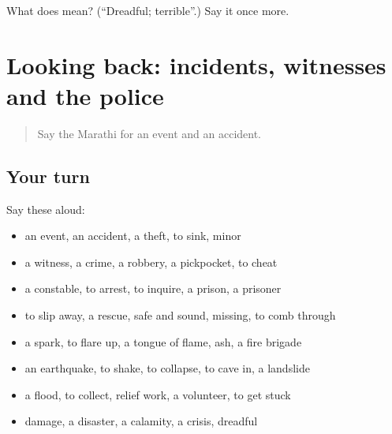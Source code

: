 \begin{tcolorbox}[breakable,colback=teal!4,colframe=teal!35!black,title={Before you move on}]
What does  mean? (\textquotedblleft{}Dreadful; terrible\textquotedblright{}.) Say it once more.
\end{tcolorbox}
\section[(dialogue)]{Looking back: incidents, witnesses and the police}

\label{lesson:MR-R295-review-288-295}



\begin{quote}
Say the Marathi for an event and an accident.
\end{quote}

\subsection*{Your turn}
Say these aloud:

\begin{itemize}
\raggedright
  \item an event, an accident, a theft, to sink, minor
  \item a witness, a crime, a robbery, a pickpocket, to cheat
  \item a constable, to arrest, to inquire, a prison, a prisoner
  \item to slip away, a rescue, safe and sound, missing, to comb through
  \item a spark, to flare up, a tongue of flame, ash, a fire brigade
  \item an earthquake, to shake, to collapse, to cave in, a landslide
  \item a flood, to collect, relief work, a volunteer, to get stuck
  \item damage, a disaster, a calamity, a crisis, dreadful
\end{itemize}

